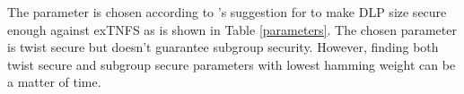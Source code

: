 The parameter is chosen according to \cite{sylvain_new_param}'s suggestion for to make DLP size secure enough against exTNFS \cite{kim_ecdlp} as is shown in Table \ref{parameters}.
The  chosen parameter is twist secure but doesn't guarantee subgroup security.
However, finding both twist secure and subgroup secure parameters with lowest hamming weight can be a matter of time.
\renewcommand{\baselinestretch}{1.5}
\begin{table}[!h]
	\setlength\tabcolsep{3pt}
	\begin{center}		 
		\caption{Selected parameters for 128-bit security level according to  \cite{sylvain_new_param}}
		\label{parameters}
	\end{center}
\end{table}
\renewcommand{\baselinestretch}{1.0}


